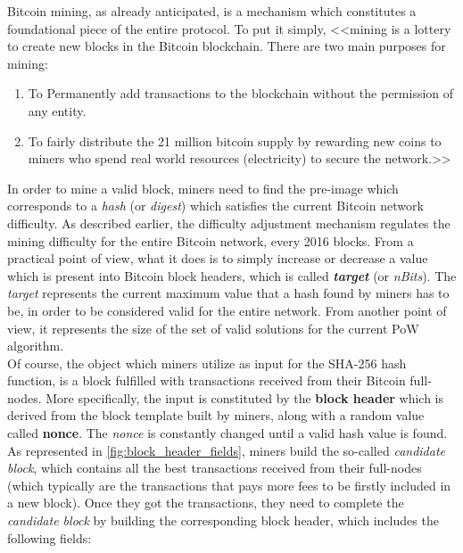Bitcoin mining, as already anticipated, is a mechanism which constitutes a foundational piece of the entire protocol. To put it simply, <<mining is a lottery to create new blocks in the Bitcoin blockchain. There are two main purposes for mining:
\begin{enumerate}
    \item To Permanently add transactions to the blockchain without the permission of any entity.
    \item To fairly distribute the 21 million bitcoin supply by rewarding new coins to miners who spend real world resources (electricity) to secure the network.>> \cite{bitcoinmininghandbook}
\end{enumerate} 

\noindent In order to mine a valid block, miners need to find the pre-image which corresponds to a \textit{hash} (or \textit{digest}) which satisfies the current Bitcoin network difficulty. As described earlier, the difficulty adjustment mechanism regulates the mining difficulty for the entire Bitcoin network, every 2016 blocks. From a practical point of view, what it does is to simply increase or decrease a value which is present into Bitcoin block headers, which is called \textit{\textbf{target}} (or \textit{nBits}). The \textit{target} represents the current maximum value that a hash found by miners has to be, in order to be considered valid for the entire network. From another point of view, it represents the size of the set of valid solutions for the current PoW algorithm.\\
\noindent Of course, the object which miners utilize as input for the SHA-256 hash function, is a block fulfilled with transactions received from their Bitcoin full-nodes. More specifically, the input is constituted by the \textbf{block header} which is derived from the block template built by miners, along with a random value called \textbf{nonce}. The \textit{nonce} is constantly changed until a valid hash value is found.\\
As represented in \ref{fig:block_header_fields}, miners build the so-called \textit{candidate block}, which contains all the best transactions received from their full-nodes (which typically are the transactions that pays more fees to be firstly included in a new block). Once they got the transactions, they need to complete the \textit{candidate block} by building the corresponding block header, which includes the following fields:

